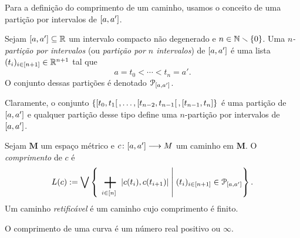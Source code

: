Para a definição do comprimento de um caminho, usamos o conceito de uma partição por intervalos de $\left[{a},{a'}\right]$.

\begin{definition}
Sejam $\left[{a},{a'}\right] \subseteq \mathbb{R}$ um intervalo compacto não degenerado e $n \in \mathbb{N} \smallsetminus \{0\}$. Uma \emph{$n$-partição por intervalos} (ou \emph{partição por $n$ intervalos}) de $\left[{a},{a'}\right]$ é uma lista $(t_i)_{i \in [n+1]} \in \mathbb{R}^{n+1}$ tal que
	\begin{equation*}
	a = t_0 < \cdots < t_n = a'.
	\end{equation*}
O conjunto dessas partições é denotado $\mathcal{P}_{\left[{a},{a'}\right]}$.
\end{definition}

Claramente, o conjunto $\{\left[{t_0},{t_1}\right[,\ldots,\left[{t_{n-2}},{t_{n-1}}\right[,\left[{t_{n-1}},{t_{n}}\right]\}$ é uma partição de $\left[{a},{a'}\right]$ e qualquer partição desse tipo define uma $n$-partição por intervalos de $\left[{a},{a'}\right]$.

\begin{definition}
Sejam $\bm M$ um espaço métrico e ${c}\colon {\left[{a},{a'}\right]} \longrightarrow {M}$ um caminho em $\bm M$. O \emph{comprimento} de $c$ é
	\begin{equation*}
	\compr{c} := \sup\set{\sum_{i \in [n]} \dist{c(t_i)}{c(t_{i+1})}}{(t_i)_{i \in [n+1]} \in \Part_{\intff{a}{a'}}}.
	\end{equation*}
Um caminho \emph{retificável} é um caminho cujo comprimento é finito.
\end{definition}

O comprimento de uma curva é um número real positivo ou $\infty$.

